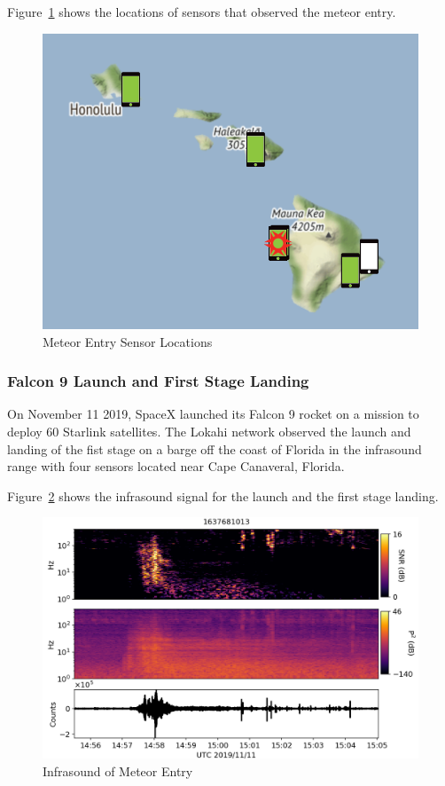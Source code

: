 Figure~\ref{fig:meteor_2} shows the locations of sensors that observed the meteor entry.

\begin{figure}[H]
    \centering
    \includegraphics[width=.75\linewidth]{figures/meteor_2.png}
    \caption{Meteor Entry Sensor Locations}
    \label{fig:meteor_2}
\end{figure}

\subsubsection{Falcon 9 Launch and First Stage Landing}

On November 11 2019, SpaceX launched its Falcon 9 rocket on a mission to deploy 60 Starlink satellites\cite{spacex}. The Lokahi network observed the launch and landing of the fist stage on a barge off the coast of Florida in the infrasound range with four sensors located near Cape Canaveral, Florida.

Figure~\ref{fig:spacex_1} shows the infrasound signal for the launch and the first stage landing.

\begin{figure}[H]
    \centering
    \includegraphics[width=\linewidth]{figures/spacex_1.png}
    \caption{Infrasound of Meteor Entry}
    \label{fig:spacex_1}
\end{figure}

